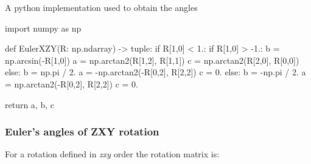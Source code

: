     A python implementation used to obtain the angles

\begin{python}
import numpy as np

def EulerXZY(R: np.ndarray) -> tuple:
    if R[1,0] < 1.:
        if R[1,0] > -1.:
            b = np.arcsin(-R[1,0])
            a = np.arctan2(R[1,2], R[1,1])
            c = np.arctan2(R[2,0], R[0,0])
        else:
            b = np.pi / 2.
            a = -np.arctan2(-R[0,2], R[2,2])
            c = 0.
    else:
        b = -np.pi / 2.
        a = np.arctan2(-R[0,2], R[2,2])
        c = 0.

    return a, b, c
\end{python}


\subsubsection{Euler's angles of \textbf{ZXY} rotation}

    For a rotation defined in \textit{zxy} order the rotation matrix is:

